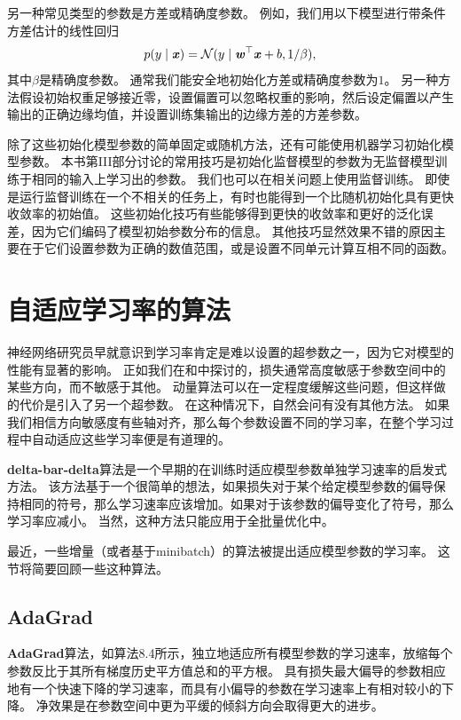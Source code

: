 另一种常见类型的参数是方差或精确度参数。
例如，我们用以下模型进行带条件方差估计的线性回归
\begin{equation}
    p(y\mid\boldsymbol{\mathit{x}}) = \mathcal{N} (y \mid \boldsymbol{\mathit{w}}^\top \boldsymbol{\mathit{x}} + b, 1/\beta) ,
\end{equation}
其中$\beta$是精确度参数。
通常我们能安全地初始化方差或精确度参数为$1$。
另一种方法假设初始权重足够接近零，设置偏置可以忽略权重的影响，然后设定偏置以产生输出的正确边缘均值，并设置训练集输出的边缘方差的方差参数。


除了这些初始化模型参数的简单固定或随机方法，还有可能使用机器学习初始化模型参数。
本书第III部分讨论的常用技巧是初始化监督模型的参数为无监督模型训练于相同的输入上学习出的参数。
我们也可以在相关问题上使用监督训练。
即使是运行监督训练在一个不相关的任务上，有时也能得到一个比随机初始化具有更快收敛率的初始值。
这些初始化技巧有些能够得到更快的收敛率和更好的泛化误差，因为它们编码了模型初始参数分布的信息。
其他技巧显然效果不错的原因主要在于它们设置参数为正确的数值范围，或是设置不同单元计算互相不同的函数。

\section{自适应学习率的算法}
\label{sec:algorithms_with_adaptive_learning_rates}
神经网络研究员早就意识到学习率肯定是难以设置的超参数之一，因为它对模型的性能有显著的影响。
正如我们在和中探讨的，损失通常高度敏感于参数空间中的某些方向，而不敏感于其他。
动量算法可以在一定程度缓解这些问题，但这样做的代价是引入了另一个超参数。
在这种情况下，自然会问有没有其他方法。
如果我们相信方向敏感度有些轴对齐，那么每个参数设置不同的学习率，在整个学习过程中自动适应这些学习率便是有道理的。

\textbf{delta-bar-delta}算法\citep{jacobs1988}是一个早期的在训练时适应模型参数单独学习速率的启发式方法。
该方法基于一个很简单的想法，如果损失对于某个给定模型参数的偏导保持相同的符号，那么学习速率应该增加。如果对于该参数的偏导变化了符号，那么学习率应减小。
当然，这种方法只能应用于全批量优化中。

最近，一些增量（或者基于\gls{minibatch}）的算法被提出适应模型参数的学习率。
这节将简要回顾一些这种算法。


\subsection{AdaGrad}
\label{sec:adagrad}
\textbf{AdaGrad}算法，如算法8.4所示，独立地适应所有模型参数的学习速率，放缩每个参数反比于其所有梯度历史平方值总和的平方根\citep{Duchi+al-2011}。
具有损失最大偏导的参数相应地有一个快速下降的学习速率，而具有小偏导的参数在学习速率上有相对较小的下降。
净效果是在参数空间中更为平缓的倾斜方向会取得更大的进步。

